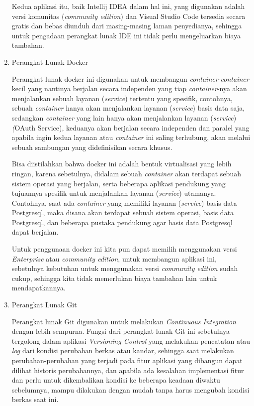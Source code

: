 \documentclass[pdftex,12pt, oneside]{article}
\begin{document}
\begin{enumerate}
Kedua aplikasi itu, baik Intellij IDEA dalam hal ini, yang digunakan adalah versi komunitas (\textit{community edition}) dan Visual Studio Code tersedia secara gratis dan bebas diunduh dari masing-masing laman penyedianya, sehingga untuk pengadaan perangkat lunak IDE ini tidak perlu mengeluarkan biaya tambahan.

		\item Perangkat Lunak Docker
		
		Perangkat lunak docker ini digunakan untuk membangun \textit{container-container} kecil yang nantinya berjalan secara independen yang tiap \textit{container}-nya akan menjalankan sebuah layanan (\textit{service}) tertentu yang spesifik, contohnya, sebuah \textit{container} hanya akan menjalankan layanan (\textit{service}) basis data saja, sedangkan \textit{container} yang lain hanya akan menjalankan layanan (\textit{service}) \textit({OAuth Service}), keduanya akan berjalan secara independen dan paralel yang apabila ingin kedua layanan atau \textit{container} ini saling terhubung, akan melalui sebuah sambungan yang didefinisikan secara khusus.
		
		Bisa diistilahkan bahwa docker ini adalah bentuk virtualisasi yang lebih ringan, karena sebetulnya, didalam sebuah \textit{container} akan terdapat sebuah sistem operasi yang berjalan, serta beberapa aplikasi pendukung yang tujuannya spesifik untuk menjalankan layanan (\textit{service}) utamanya. Contohnya, saat ada \textit{container} yang memiliki layanan (\textit{service}) basis data Postgresql, maka disana akan terdapat sebuah sistem operasi, basis data Postgresql, dan beberapa pustaka pendukung agar basis data Postgresql dapat berjalan.
		
		Untuk penggunaan docker ini kita pun dapat memilih menggunakan versi \textit{Enterprise} atau \textit{community edition}, untuk membangun aplikasi ini, sebetulnya kebutuhan untuk menggunakan versi \textit{community edition} sudah cukup, sehingga kita tidak memerlukan biaya tambahan lain untuk mendapatkannya.
		
		\item Perangkat Lunak Git
		
		Perangkat lunak Git digunakan untuk melakukan \textit{Continuous Integration} dengan lebih sempurna. Fungsi dari perangkat lunak Git ini sebetulnya tergolong dalam aplikasi \textit{Versioning Control} yang melakukan pencatatan atau \textit{log} dari kondisi perubahan berkas atau kandar, sehingga saat melakukan perubahan-perubahan yang terjadi pada fitur aplikasi yang dibangun dapat dilihat historis perubahannya, dan apabila ada kesalahan implementasi fitur dan perlu untuk dikembalikan kondisi ke beberapa keadaan diwaktu sebelumnya, mampu dilakukan dengan mudah tanpa harus mengubah kondisi berkas saat ini.
		

\end{enumerate}
\end{document}
